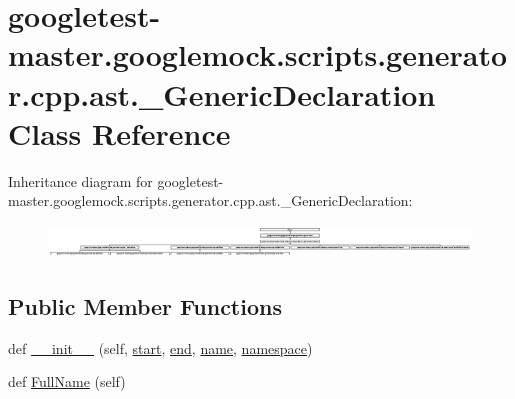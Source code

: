 \hypertarget{classgoogletest-master_1_1googlemock_1_1scripts_1_1generator_1_1cpp_1_1ast_1_1___generic_declaration}{}\section{googletest-\/master.googlemock.\+scripts.\+generator.\+cpp.\+ast.\+\_\+\+Generic\+Declaration Class Reference}
\label{classgoogletest-master_1_1googlemock_1_1scripts_1_1generator_1_1cpp_1_1ast_1_1___generic_declaration}
Inheritance diagram for googletest-\/master.googlemock.\+scripts.\+generator.\+cpp.\+ast.\+\_\+\+Generic\+Declaration\+:\begin{figure}[H]
\begin{center}
\leavevmode
\includegraphics[height=0.873362cm]{da/dd2/classgoogletest-master_1_1googlemock_1_1scripts_1_1generator_1_1cpp_1_1ast_1_1___generic_declaration}
\end{center}
\end{figure}
\subsection*{Public Member Functions}
\begin{DoxyCompactItemize}
\item 
def \mbox{\hyperlink{classgoogletest-master_1_1googlemock_1_1scripts_1_1generator_1_1cpp_1_1ast_1_1___generic_declaration_ae630aa65920ee0001bfd057ffa9e460c}{\+\_\+\+\_\+init\+\_\+\+\_\+}} (self, \mbox{\hyperlink{classgoogletest-master_1_1googlemock_1_1scripts_1_1generator_1_1cpp_1_1ast_1_1_node_a6f9eb279a989f9ca27e7d0f1975336d1}{start}}, \mbox{\hyperlink{classgoogletest-master_1_1googlemock_1_1scripts_1_1generator_1_1cpp_1_1ast_1_1_node_a747e90ade89c1764e83b5b649bde18cc}{end}}, \mbox{\hyperlink{classgoogletest-master_1_1googlemock_1_1scripts_1_1generator_1_1cpp_1_1ast_1_1___generic_declaration_a85dc1c6f0115301c310cd3f99416fa86}{name}}, \mbox{\hyperlink{classgoogletest-master_1_1googlemock_1_1scripts_1_1generator_1_1cpp_1_1ast_1_1___generic_declaration_a285067decd742f4effc0d1bc674bce85}{namespace}})
\item 
def \mbox{\hyperlink{classgoogletest-master_1_1googlemock_1_1scripts_1_1generator_1_1cpp_1_1ast_1_1___generic_declaration_af6b178dab6526e46fe28e11d3608c30b}{Full\+Name}} (self)
\end{DoxyCompactItemize}
